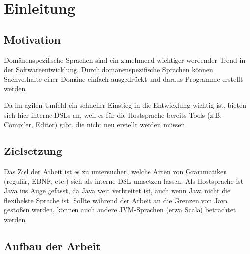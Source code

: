 \documentclass[../InterneDSLs.tex]{subfiles}
\begin{document}
\chapter{Einleitung}


\section{Motivation}
Domänenspezifische Sprachen sind ein zunehmend wichtiger werdender Trend in der Softwareentwicklung. Durch domänenspezifische Sprachen können Sachverhalte einer Domäne einfach ausgedrückt und daraus Programme erstellt werden. 

Da im agilen Umfeld ein schneller Einstieg in die Entwicklung wichtig ist, bieten sich hier interne \acsp{DSL} an, weil es für die \Gls{Hostsprache} bereits Tools (z.B. Compiler, Editor) gibt, die nicht neu erstellt werden müssen.


\section{Zielsetzung}
Das Ziel der Arbeit ist es zu untersuchen, welche Arten von Grammatiken (regulär, \ac{EBNF}, etc.) sich als interne DSL umsetzen lassen. Als Hostsprache ist Java ins Auge gefasst, da Java weit verbreitet ist, auch wenn Java nicht die flexibelste Sprache ist. Sollte während der Arbeit an die Grenzen von Java gestoßen werden, können auch andere \ac{JVM}-Sprachen (etwa Scala) betrachtet werden.


\section{Aufbau der Arbeit}
\end{document}
